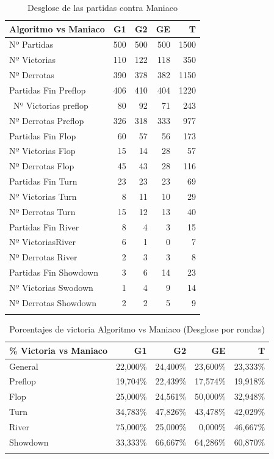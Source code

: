 \vspace{5mm} %

\begin{longtable}[c]{lrrrr}
\hline
Algoritmo vs Maniaco & G1 & G2 & GE & T \\ \hline
Nº Partidas & 500 & 500 & 500 & 1500 \\ 
Nº Victorias & 110 & 122 & 118 & 350 \\ 
Nº Derrotas & 390 & 378 & 382 & 1150 \\ 
Partidas Fin Preflop & 406 & 410 & 404 & 1220 \\ \
Nº Victorias preflop & 80 & 92 & 71 & 243 \\ 
Nº Derrotas Preflop & 326 & 318 & 333 & 977 \\ 
Partidas Fin Flop & 60 & 57 & 56 & 173 \\ 
Nº Victorias Flop & 15 & 14 & 28 & 57 \\ 
Nº Derrotas Flop & 45 & 43 & 28 & 116 \\ 
Partidas Fin Turn & 23 & 23 & 23 & 69 \\ 
Nº Victorias Turn & 8 & 11 & 10 & 29 \\ 
Nº Derrotas Turn & 15 & 12 & 13 & 40 \\ 
Partidas Fin River & 8 & 4 & 3 & 15 \\ 
Nº VictoriasRiver & 6 & 1 & 0 & 7 \\ 
Nº Derrotas River & 2 & 3 & 3 & 8 \\ 
Partidas Fin Showdown & 3 & 6 & 14 & 23 \\ 
Nº Victorias Swodown & 1 & 4 & 9 & 14 \\ 
Nº Derrotas Showdown & 2 & 2 & 5 & 9 \\ \hline
\caption{Desglose de las partidas contra Maniaco}
\label{tab:PlaysM}
\end{longtable}

\begin{longtable}[c]{lrrrr}
\hline
\% Victoria vs Maniaco & G1 & G2 & GE & T \\ \hline
General & 22,000\% & 24,400\% & 23,600\% & 23,333\% \\ 
Preflop & 19,704\% & 22,439\% & 17,574\% & 19,918\% \\ 
Flop & 25,000\% & 24,561\% & 50,000\% & 32,948\% \\ 
Turn & 34,783\% & 47,826\% & 43,478\% & 42,029\% \\ 
River & 75,000\% & 25,000\% & 0,000\% & 46,667\% \\ 
Showdown & 33,333\% & 66,667\% & 64,286\% & 60,870\% \\ \hline
\caption{Porcentajes de victoria Algoritmo vs Maniaco (Desglose por rondas)}
\label{tab:winrateM}
\end{longtable}

